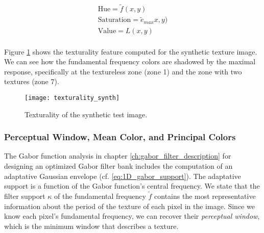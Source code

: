 \begin{gather}
    \text{Hue} = \widetilde{f}(x,y) \\
    \text{Saturation} = \widetilde{e}_{max}x,y) \\
    \text{Value} = L(x,y) \\
\end{gather}

Figure \ref{fig:texturality_synth} shows the texturality feature computed for the synthetic texture image. We can see how the fundamental frequency colors are shadowed by the maximal response, specifically at the textureless zone (zone 1) and the zone with two textures (zone 7).

\begin{figure}[!ht]
	\texttt{[image: texturality\_synth]}
    \caption{Texturality of the synthetic test image.}
    \label{fig:texturality_synth}
\end{figure}

%                  

\subsubsection{Perceptual Window, Mean Color, and Principal Colors}
The Gabor function analysis in chapter \ref{ch:gabor_filter_description} for designing an optimized Gabor filter bank includes the computation of an adaptative Gaussian envelope (cf. \eqref{eq:1D_gabor_support}). The adaptative support is a function of the Gabor function's central frequency. We state that the filter support $\kappa$ of the fundamental frequency $\widetilde{f}$ contains the most representative information about the period of the texture of each pixel in the image. Since we know each pixel's fundamental frequency, we can recover their \textit{perceptual window}, which is the minimum window that describes a texture.

